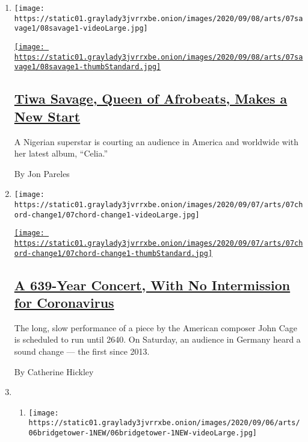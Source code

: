 \begin{enumerate}
\def\labelenumi{\arabic{enumi}.}
\item
  \texttt{[image: https://static01.graylady3jvrrxbe.onion/images/2020/09/08/arts/07savage1/08savage1-videoLarge.jpg]}

  \href{/2020/09/07/arts/music/tiwa-savage-celia.html}{\texttt{[image: https://static01.graylady3jvrrxbe.onion/images/2020/09/08/arts/07savage1/08savage1-thumbStandard.jpg]}}

  \hypertarget{tiwa-savage-queen-of-afrobeats-makes-a-new-start}{%
  \subsection{\texorpdfstring{\href{/2020/09/07/arts/music/tiwa-savage-celia.html}{Tiwa
  Savage, Queen of Afrobeats, Makes a New
  Start}}{Tiwa Savage, Queen of Afrobeats, Makes a New Start}}\label{tiwa-savage-queen-of-afrobeats-makes-a-new-start}}

  A Nigerian superstar is courting an audience in America and worldwide
  with her latest album, ``Celia.''

  By Jon Pareles
\item
  \texttt{[image: https://static01.graylady3jvrrxbe.onion/images/2020/09/07/arts/07chord-change1/07chord-change1-videoLarge.jpg]}

  \href{/2020/09/07/arts/music/john-cage-as-slow-as-possible-germany.html}{\texttt{[image: https://static01.graylady3jvrrxbe.onion/images/2020/09/07/arts/07chord-change1/07chord-change1-thumbStandard.jpg]}}

  \hypertarget{a-639-year-concert-with-no-intermission-for-coronavirus}{%
  \subsection{\texorpdfstring{\href{/2020/09/07/arts/music/john-cage-as-slow-as-possible-germany.html}{A
  639-Year Concert, With No Intermission for
  Coronavirus}}{A 639-Year Concert, With No Intermission for Coronavirus}}\label{a-639-year-concert-with-no-intermission-for-coronavirus}}

  The long, slow performance of a piece by the American composer John
  Cage is scheduled to run until 2640. On Saturday, an audience in
  Germany heard a sound change --- the first since 2013.

  By Catherine Hickley
\item
  \begin{enumerate}
  \def\labelenumii{\arabic{enumii}.}
  \item
    \texttt{[image: https://static01.graylady3jvrrxbe.onion/images/2020/09/06/arts/06bridgetower-1NEW/06bridgetower-1NEW-videoLarge.jpg]}


\end{enumerate}
\end{enumerate}
